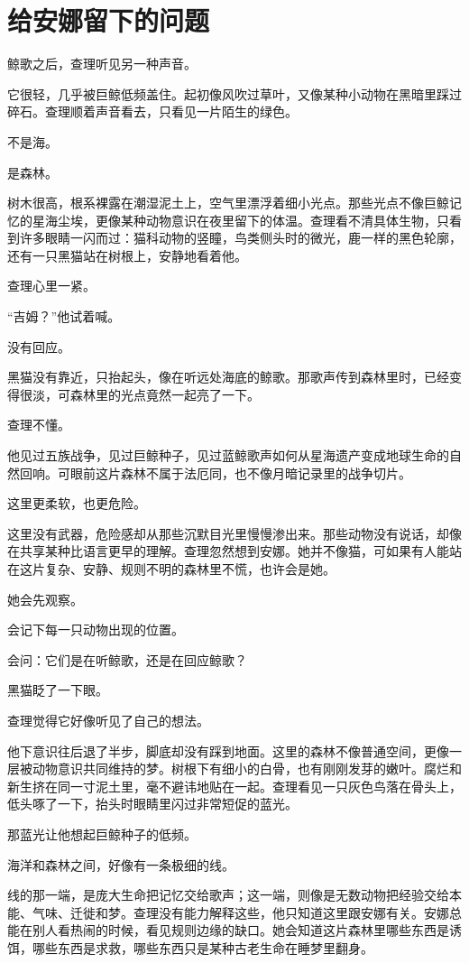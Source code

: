 \chapter{给安娜留下的问题}

鲸歌之后，查理听见另一种声音。

它很轻，几乎被巨鲸低频盖住。起初像风吹过草叶，又像某种小动物在黑暗里踩过碎石。查理顺着声音看去，只看见一片陌生的绿色。

不是海。

是森林。

树木很高，根系裸露在潮湿泥土上，空气里漂浮着细小光点。那些光点不像巨鲸记忆的星海尘埃，更像某种动物意识在夜里留下的体温。查理看不清具体生物，只看到许多眼睛一闪而过：猫科动物的竖瞳，鸟类侧头时的微光，鹿一样的黑色轮廓，还有一只黑猫站在树根上，安静地看着他。

查理心里一紧。

“吉姆？”他试着喊。

没有回应。

黑猫没有靠近，只抬起头，像在听远处海底的鲸歌。那歌声传到森林里时，已经变得很淡，可森林里的光点竟然一起亮了一下。

查理不懂。

他见过五族战争，见过巨鲸种子，见过蓝鲸歌声如何从星海遗产变成地球生命的自然回响。可眼前这片森林不属于法厄同，也不像月暗记录里的战争切片。

这里更柔软，也更危险。

这里没有武器，危险感却从那些沉默目光里慢慢渗出来。那些动物没有说话，却像在共享某种比语言更早的理解。查理忽然想到安娜。她并不像猫，可如果有人能站在这片复杂、安静、规则不明的森林里不慌，也许会是她。

她会先观察。

会记下每一只动物出现的位置。

会问：它们是在听鲸歌，还是在回应鲸歌？

黑猫眨了一下眼。

查理觉得它好像听见了自己的想法。

他下意识往后退了半步，脚底却没有踩到地面。这里的森林不像普通空间，更像一层被动物意识共同维持的梦。树根下有细小的白骨，也有刚刚发芽的嫩叶。腐烂和新生挤在同一寸泥土里，毫不避讳地贴在一起。查理看见一只灰色鸟落在骨头上，低头啄了一下，抬头时眼睛里闪过非常短促的蓝光。

那蓝光让他想起巨鲸种子的低频。

海洋和森林之间，好像有一条极细的线。

线的那一端，是庞大生命把记忆交给歌声；这一端，则像是无数动物把经验交给本能、气味、迁徙和梦。查理没有能力解释这些，他只知道这里跟安娜有关。安娜总能在别人看热闹的时候，看见规则边缘的缺口。她会知道这片森林里哪些东西是诱饵，哪些东西是求救，哪些东西只是某种古老生命在睡梦里翻身。

